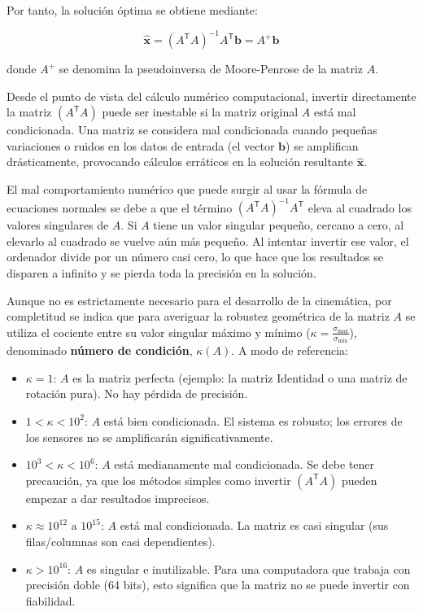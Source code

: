 \documentclass[11pt,a4paper]{article}
\newcommand{\trans}{\mathsf{T}}      %
\begin{document}
Por tanto, la solución óptima se obtiene mediante:

\begin{equation}
    \hat{\mathbf{x}} = (A^{\trans}A)^{-1}A^{\trans}\mathbf{b} = A^+\mathbf{b}
\end{equation}

donde \(A^+\) se denomina la pseudoinversa de Moore-Penrose de la matriz \(A\).

Desde el punto de vista del cálculo numérico computacional, invertir directamente la matriz \((A^{\trans}A)\) puede ser inestable si la matriz original \(A\) está mal condicionada. Una matriz se considera mal condicionada cuando pequeñas variaciones o ruidos en los datos de entrada (el vector \(\mathbf{b}\)) se amplifican drásticamente, provocando cálculos erráticos en la solución resultante \(\hat{\mathbf{x}}\).

El mal comportamiento numérico que puede surgir al usar la fórmula de ecuaciones normales se debe a que el término \((A^{\trans}A)^{-1}\allowbreak A^{\trans}\) eleva al cuadrado los valores singulares de \(A\). Si \(A\) tiene un valor singular pequeño, cercano a cero, al elevarlo al cuadrado se vuelve aún más pequeño. Al intentar invertir ese valor, el ordenador divide por un número casi cero, lo que hace que los resultados se disparen a infinito y se pierda toda la precisión en la solución.

Aunque no es estrictamente necesario para el desarrollo de la cinemática, por completitud se indica que para averiguar la robustez geométrica de la matriz \(A\) se utiliza el cociente entre su valor singular máximo y mínimo (\(\kappa = \frac{\sigma_{\max}}{\sigma_{\min}}\)), denominado \textbf{número de condición}, \(\kappa(A)\). A modo de referencia:

\begin{itemize}
    \item \(\kappa = 1\): \(A\) es la matriz perfecta (ejemplo: la matriz Identidad o una matriz de rotación pura). No hay pérdida de precisión.
    \item \(1 < \kappa < 10^2\): \(A\) está bien condicionada. El sistema es robusto; los errores de los sensores no se amplificarán significativamente.
    \item \(10^3 < \kappa < 10^6\): \(A\) está medianamente mal condicionada. Se debe tener precaución, ya que los métodos simples como invertir \((A^{\trans}A)\) pueden empezar a dar resultados imprecisos.
    \item \(\kappa \approx 10^{12} \text{ a } 10^{15}\): \(A\) está mal condicionada. La matriz es casi singular (sus filas/columnas son casi dependientes).
    \item \(\kappa > 10^{16}\): \(A\) es singular e inutilizable. Para una computadora que trabaja con precisión doble (64 bits), esto significa que la matriz no se puede invertir con fiabilidad.
\end{itemize}
\end{document}
